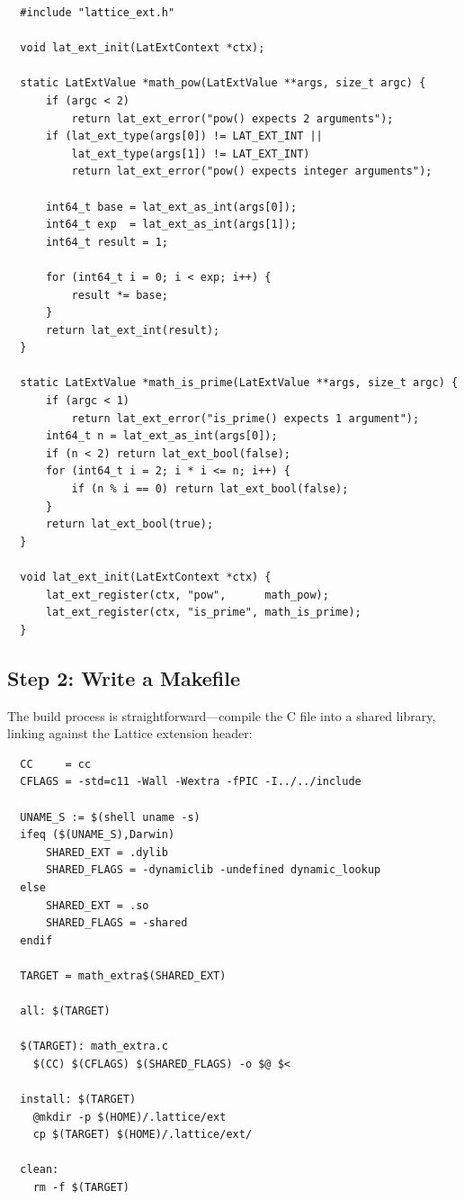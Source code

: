 \begin{verbatim}
  #include "lattice_ext.h"

  void lat_ext_init(LatExtContext *ctx);

  static LatExtValue *math_pow(LatExtValue **args, size_t argc) {
      if (argc < 2)
          return lat_ext_error("pow() expects 2 arguments");
      if (lat_ext_type(args[0]) != LAT_EXT_INT ||
          lat_ext_type(args[1]) != LAT_EXT_INT)
          return lat_ext_error("pow() expects integer arguments");

      int64_t base = lat_ext_as_int(args[0]);
      int64_t exp  = lat_ext_as_int(args[1]);
      int64_t result = 1;

      for (int64_t i = 0; i < exp; i++) {
          result *= base;
      }
      return lat_ext_int(result);
  }

  static LatExtValue *math_is_prime(LatExtValue **args, size_t argc) {
      if (argc < 1)
          return lat_ext_error("is_prime() expects 1 argument");
      int64_t n = lat_ext_as_int(args[0]);
      if (n < 2) return lat_ext_bool(false);
      for (int64_t i = 2; i * i <= n; i++) {
          if (n % i == 0) return lat_ext_bool(false);
      }
      return lat_ext_bool(true);
  }

  void lat_ext_init(LatExtContext *ctx) {
      lat_ext_register(ctx, "pow",      math_pow);
      lat_ext_register(ctx, "is_prime", math_is_prime);
  }
\end{verbatim}

\subsection{Step 2: Write a Makefile}

The build process is straightforward---compile the C file into a shared library, linking against the Lattice extension header:

\begin{verbatim}
  CC     = cc
  CFLAGS = -std=c11 -Wall -Wextra -fPIC -I../../include

  UNAME_S := $(shell uname -s)
  ifeq ($(UNAME_S),Darwin)
      SHARED_EXT = .dylib
      SHARED_FLAGS = -dynamiclib -undefined dynamic_lookup
  else
      SHARED_EXT = .so
      SHARED_FLAGS = -shared
  endif

  TARGET = math_extra$(SHARED_EXT)

  all: $(TARGET)

  $(TARGET): math_extra.c
  	$(CC) $(CFLAGS) $(SHARED_FLAGS) -o $@ $<

  install: $(TARGET)
  	@mkdir -p $(HOME)/.lattice/ext
  	cp $(TARGET) $(HOME)/.lattice/ext/

  clean:
  	rm -f $(TARGET)
\end{verbatim}


